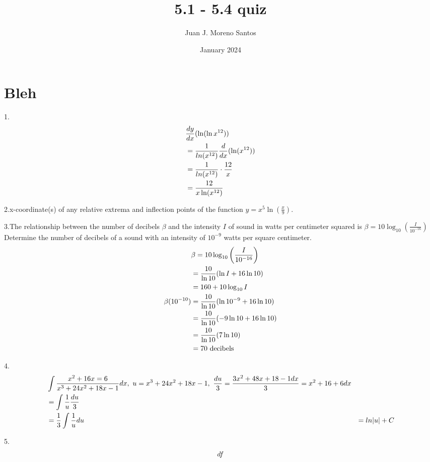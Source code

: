 \documentclass[11pt]{article}
\newcommand*{\set}{\setcounter{equation}{0}}
\newcommand*{\lt}{\left}
\newcommand*{\rt}{\right}
\begin{document}
\title{5.1 - 5.4 quiz}
\author{Juan J. Moreno Santos}
\date{January 2024}

\maketitle
\section{Bleh}

1.\begin{align}
    \set
    &\frac{dy}{dx}(\ln(\ln x^{12}))\\
    &=\frac{1}{ln(x^{12})}\frac{d}{dx}(\ln(x^{12}))\\
    &=\frac{1}{ln(x^{12})}\cdot\frac{12}{x}\\
    &=\frac{12}{x\ln(x^{12})}
\end{align}

2.x-coordinate(s) of any relative extrema and inflection points of the function $y=x^5\ln(\frac{x}{9})$.



3.The relationship between the number of decibels $\beta$ and the intensity $I$ of sound in watts per centimeter squared is 
$\beta=10\log_{10}\lt(\frac{I}{10^{-16}}\rt)$ Determine the number of decibels of a sound with an intensity of $10^{-9}$ watts per square centimeter.
\begin{align}
    \set
    &\beta=10\log_{10}\lt(\frac{I}{10^{-16}}\rt)\\
    &=\frac{10}{\ln 10}(\ln I+16\ln 10)\\
    &=160+10\log_{10}I\\
    \beta(10^{-10})&=\frac{10}{\ln 10}(\ln 10^{-9}+16\ln 10)\\
    &=\frac{10}{\ln 10}(-9\ln 10+16\ln 10)\\
    &=\frac{10}{\ln 10}(7\ln 10)\\
    &=70\,\,\text{decibels}
\end{align}

4.\begin{align}
    \set
    &\int\frac{x^2+16x=6}{x^3+24x^2+18x-1}dx,\,\, u=x^3+24x^2+18x-1,\,\,  \frac{du}{3}=\frac{3x^2+48x+18-1dx}{3}=x^2+16+6dx\\
    &=\int\frac{1}{u}\frac{du}{3}\\
    &=\frac{1}{3}\int\frac{1}{u}du
    &=ln|u|+C
\end{align}

5.\begin{align}
    \set
    df
\end{align}
\end{document}
